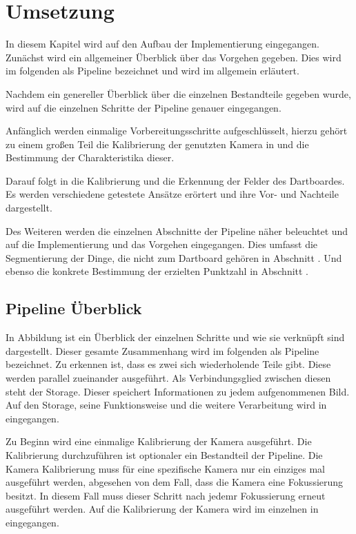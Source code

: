 
\chapter{Umsetzung}
\label{chap:coding}
In diesem Kapitel wird auf den Aufbau der Implementierung eingegangen. Zunächst wird ein allgemeiner Überblick über das Vorgehen gegeben. Dies wird im folgenden als Pipeline bezeichnet und wird im  allgemein erläutert.

Nachdem ein genereller Überblick über die einzelnen Bestandteile gegeben wurde, wird auf die einzelnen Schritte der Pipeline genauer eingegangen.

Anfänglich werden einmalige Vorbereitungsschritte aufgeschlüsselt, hierzu gehört zu einem großen Teil die Kalibrierung der genutzten Kamera in  und die Bestimmung der Charakteristika dieser. 

Darauf folgt in  die Kalibrierung und die Erkennung der Felder des Dartboardes. Es werden verschiedene getestete Ansätze erörtert und ihre Vor- und Nachteile dargestellt.

Des Weiteren werden die einzelnen Abschnitte der Pipeline näher beleuchtet und auf die Implementierung und das Vorgehen eingegangen.  Dies umfasst die Segmentierung der Dinge, die nicht zum Dartboard gehören in Abschnitt . Und ebenso die konkrete
Bestimmung der erzielten Punktzahl in Abschnitt .
       
\section{Pipeline Überblick}
\label{sec:pipeline}
In Abbildung  ist ein Überblick der einzelnen Schritte und wie sie verknüpft sind dargestellt. Dieser gesamte Zusammenhang wird im folgenden als Pipeline bezeichnet.
Zu erkennen ist, dass es zwei sich wiederholende Teile gibt. Diese werden parallel zueinander ausgeführt.
 Als Verbindungsglied zwischen diesen steht der Storage. Dieser speichert Informationen zu jedem aufgenommenen Bild. Auf den Storage, seine Funktionsweise und die weitere Verarbeitung wird in  eingegangen. 

Zu Beginn wird eine einmalige Kalibrierung der Kamera ausgeführt. Die Kalibrierung durchzuführen ist optionaler ein Bestandteil der Pipeline. Die Kamera Kalibrierung muss für eine spezifische Kamera nur ein einziges mal ausgeführt werden, abgesehen von dem Fall, dass die Kamera eine Fokussierung besitzt. In diesem Fall muss dieser Schritt nach jedemr Fokussierung erneut ausgeführt werden. Auf die Kalibrierung der Kamera wird im einzelnen in  eingegangen.

